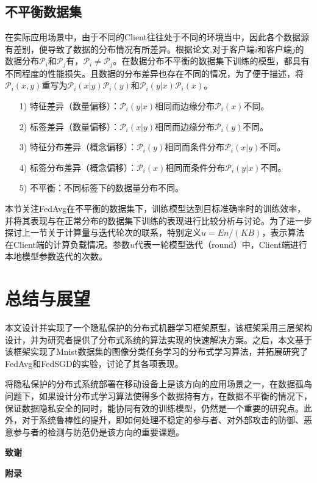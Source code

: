 \documentclass[zihao = -4,cn]{oucart}
\begin{document}
\subsection{不平衡数据集}
在实际应用场景中，由于不同的Client往往处于不同的环境当中，因此各个数据源有差别，便导致了数据的分布情况有所差异。根据论文\cite{hsieh2019non},对于客户端$i$和客户端$j$的数据分布$\mathcal{P}_i$和$\mathcal{P}_j$有，$\mathcal{P}_i \not= \mathcal{P}_j$。在数据分布不平衡的数据集下训练的模型，都具有不同程度的性能损失。且数据的分布差异也存在不同的情况，为了便于描述，将$\mathcal{P}_i(x,y)$重写为$\mathcal{P}_i(x|y)\mathcal{P}_i(y)$和$\mathcal{P}_i(y|x)\mathcal{P}_i(x)$。
\begin{itemize}
	\item [1)]
	特征差异（数量偏移）：$\mathcal{P}_i(y|x)$相同而边缘分布$\mathcal{P}_i(x)$不同。
	\item [2)]
	标签差异（数量偏移）：$\mathcal{P}_i(x|y)$相同而边缘分布$\mathcal{P}_i(y)$不同。
	\item [3)]
	特征分布差异（概念偏移）：$\mathcal{P}_i(y)$相同而条件分布$\mathcal{P}_i(x|y)$不同。
	\item [4)]
	标签分布差异（概念偏移）：$\mathcal{P}_i(x)$相同而条件分布$\mathcal{P}_i(y|x)$不同。
	\item [5)]
	不平衡：不同标签下的数据量分布不同。
\end{itemize}
\par
本节关注FedAvg在不平衡的数据集下，训练模型达到目标准确率时的训练效率，并将其表现与在正常分布的数据集下训练的表现进行比较分析与讨论。为了进一步探讨上一节关于计算量与迭代轮次的联系，特别定义$u=En/(KB)$，表示算法在Client端的计算负载情况。参数$u$代表一轮模型迭代（round）中，Client端进行本地模型参数迭代的次数。

\section{总结与展望}
本文设计并实现了一个隐私保护的分布式机器学习框架原型，该框架采用三层架构设计，并为研究者提供了分布式系统的算法实现的快速解决方案。之后，本文基于该框架实现了Mnist数据集的图像分类任务学习的分布式学习算法，并拓展研究了FedAvg和FedSGD的实验，讨论了其各项表现。\par
将隐私保护的分布式系统部署在移动设备上是该方向的应用场景之一，在数据孤岛问题下，如果设计分布式学习算法使得多个数据持有方，在数据不平衡的情况下，保证数据隐私安全的同时，能协同有效的训练模型，仍然是一个重要的研究点。此外，对于系统鲁棒性的提升，即如何处理不稳定的参与者、对外部攻击的防御、恶意参与者的检测与防范仍是该方向的重要课题。

\newpage
%


\newpage
\begin{center}
 \textbf{致谢} \\
\end{center}

\newpage
\begin{center}
 \textbf{附录} \\
\end{center}
\end{document}
